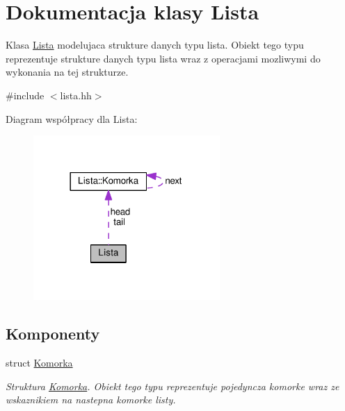 \hypertarget{class_lista}{\section{Dokumentacja klasy Lista}
\label{class_lista}
}


Klasa \hyperlink{class_lista}{Lista} modelujaca strukture danych typu lista. Obiekt tego typu reprezentuje strukture danych typu lista wraz z operacjami mozliwymi do wykonania na tej strukturze.  




{\ttfamily \#include $<$lista.\-hh$>$}



Diagram współpracy dla Lista\-:\nopagebreak
\begin{figure}[H]
\begin{center}
\leavevmode
\includegraphics[width=201pt]{class_lista__coll__graph}
\end{center}
\end{figure}
\subsection*{Komponenty}
\begin{DoxyCompactItemize}
\item 
struct \hyperlink{struct_lista_1_1_komorka}{Komorka}
\begin{DoxyCompactList}\small\item\em Struktura \hyperlink{struct_lista_1_1_komorka}{Komorka}. Obiekt tego typu reprezentuje pojedyncza komorke wraz ze wskaznikiem na nastepna komorke listy. \end{DoxyCompactList}\end{DoxyCompactItemize}

